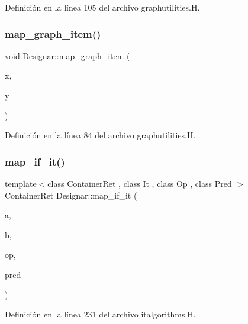 Definición en la línea 105 del archivo graphutilities.\+H.

\mbox{\label{namespace_designar_a9f88b21c36d5175a156085da54ae0142}} 
\subsubsection{\texorpdfstring{map\+\_\+graph\+\_\+item()}{map\_graph\_item()}}
{\footnotesize\ttfamily void Designar\+::map\+\_\+graph\+\_\+item (\begin{DoxyParamCaption}\item[{\hyperlink{class_designar_1_1_common_node_arc}{Common\+Node\+Arc} \&}]{x,  }\item[{\hyperlink{class_designar_1_1_common_node_arc}{Common\+Node\+Arc} \&}]{y }\end{DoxyParamCaption})\hspace{0.3cm}{\ttfamily [inline]}}



Definición en la línea 84 del archivo graphutilities.\+H.

\mbox{\label{namespace_designar_ac984c3a6f2c6c94cee1ab57e8fddd3a8}} 
\subsubsection{\texorpdfstring{map\+\_\+if\+\_\+it()}{map\_if\_it()}\hspace{0.1cm}{\footnotesize\ttfamily [1/4]}}
{\footnotesize\ttfamily template$<$class Container\+Ret , class It , class Op , class Pred $>$ \\
Container\+Ret Designar\+::map\+\_\+if\+\_\+it (\begin{DoxyParamCaption}\item[{const It \&}]{a,  }\item[{const It \&}]{b,  }\item[{Op \&}]{op,  }\item[{Pred \&}]{pred }\end{DoxyParamCaption})}



Definición en la línea 231 del archivo italgorithms.\+H.


